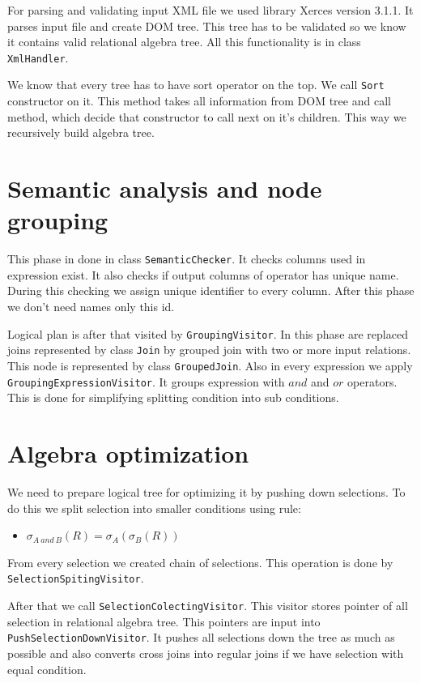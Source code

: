 For parsing and validating input XML file we used library Xerces version 3.1.1\cite{xerces}. It parses input file and create DOM tree. This tree has to be validated so we know it contains valid relational algebra tree. All this functionality is in class \texttt{XmlHandler}.

We know that every tree has to have sort operator on the top. We call \texttt{Sort} constructor on it. This method takes all information from DOM tree and call method, which decide that constructor to call next on it's children. This way we recursively build algebra tree.



\section{Semantic analysis and node grouping}

This phase in done in class \texttt{SemanticChecker}. It checks columns used in expression exist. It also checks if output columns of operator has unique name. During this checking we assign unique identifier to every column. After this phase we don't need names only this id.

Logical plan is after that visited by \texttt{GroupingVisitor}. In this phase are replaced joins represented by class \texttt{Join} by grouped join with two or more input relations. This node is represented by class \texttt{GroupedJoin}. Also in every expression we apply \texttt{GroupingExpressionVisitor}. It groups expression with $and$ and $or$ operators. This is done for simplifying splitting condition into sub conditions.

\section{Algebra optimization}

We need to prepare logical tree for optimizing it by pushing down selections. To do this we split selection into smaller conditions using rule:
\begin{itemize}
\item $\sigma_{A~and~B}(R)=\sigma_{A}(\sigma_{B}(R))$
\end{itemize}
From every selection we created chain of selections. This operation is done by \texttt{SelectionSpitingVisitor}.

After that we call \texttt{SelectionColectingVisitor}. This visitor stores pointer of all selection in relational algebra tree. This pointers are input into \texttt{Push\-Selection\-Down\-Visitor}. It pushes all selections down the tree as much as possible and also converts cross joins into regular joins if we have selection with equal condition.

